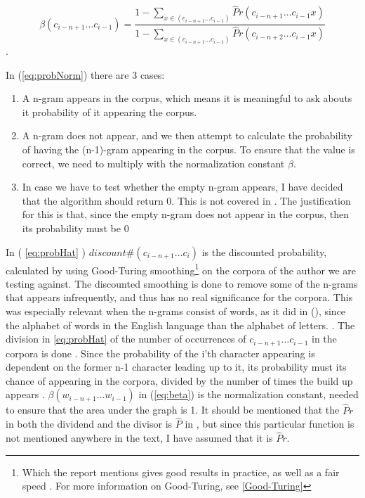 \begin{equation}
\label{eq:beta}
\beta(c_{i - n + 1} \ldots c_{i-1}) = 
\frac
{1 - \sum_{x \in (c_{i - n + 1} \ldots c_{i-1})}\hat{P}r(c_{i - n + 1} \ldots c_{i-1} x)}
{1 - \sum_{x \in (c_{i - n + 1} \ldots c_{i-1})}\hat{P}r(c_{i - n + 2} \ldots c_{i-1} x)}
\end{equation}.

In (\ref{eq:probNorm}) there are 3 cases:
\begin{enumerate}
\item A n-gram appears in the corpus, which means it is meaningful to ask abouts it probability of it appearing the corpus.
\item  A n-gram does not appear, and we then attempt to calculate the probability of having the (n-1)-gram appearing in the corpus. To ensure that the value is correct, we need to multiply with the normalization constant $\beta$. 
\item In case we have to test whether the empty n-gram appears, I have decided that the algorithm should return 0. This is not covered in \cite{nr4}. The justification for this is that, since the empty n-gram does not appear in the corpus, then its probability must be 0
\end{enumerate}
In ( \ref{eq:probHat} ) $discount\#(c_{i - n + 1} \ldots c_{i})$ 
is the discounted probability, calculated by using Good-Turing smoothing\footnote{Which the report mentions gives good results in practice, as well as a fair speed \cite{nr4}. For more information on Good-Turing, see \ref{Good-Turing}} on the corpora of the author we are testing against. The discounted smoothing is done to remove some of the n-grams that appears infrequently, and thus has no real significance for the corpora. This was especially relevant when the n-grams consist of words, as it did in (\cite{nr4}), since the alphabet of words in the English language than the alphabet of letters. . The division in \ref{eq:probHat} of the number of occurrences of $c_{i - n + 1} \ldots c_{i - 1}$ in the corpora is done . Since the probability of the i'th character appearing is dependent on the former n-1 character leading up to it, its probability must its chance of appearing in the corpora, divided by the number of times the build up appears .
$\beta (w_{i - n + 1}\ldots w_{i -1})$ in (\ref{eq:beta}) is the normalization constant, needed to ensure that the area under the graph is 1. It should be mentioned that the $\hat{P}r$ in both the dividend and the divisor is $\hat{P}$ in \cite{nr4}, but since this particular function is not mentioned anywhere in the text, I have assumed that it is $\hat{P}r$.


